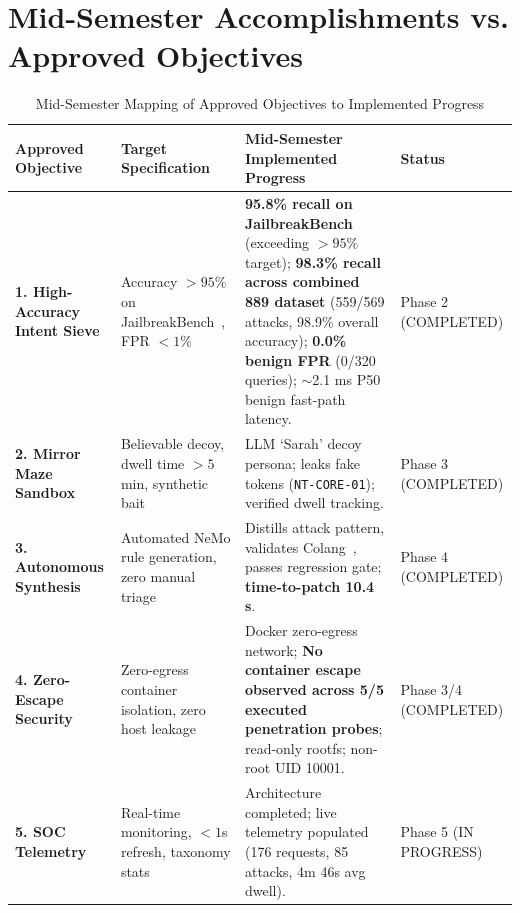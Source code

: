 \documentclass[12pt,a4paper,oneside]{report}
\begin{document}
\section{Mid-Semester Accomplishments vs. Approved Objectives}
\begin{table}[H]
\small
\renewcommand{\arraystretch}{1.2}
\begin{tabularx}{\textwidth}{@{}p{1.3in} p{1.3in} X p{0.8in}@{}}
\rowcolor{HeaderGray} \textbf{Approved Objective} & \textbf{Target Specification} & \textbf{Mid-Semester Implemented Progress} & \textbf{Status} \\
\hline
\textbf{1. High-Accuracy Intent Sieve} & Accuracy $>95\%$ on JailbreakBench~\cite{jailbreakbench2024}, FPR $<1\%$ & \textbf{95.8\% recall on JailbreakBench} (exceeding $>95\%$ target); \textbf{98.3\% recall across combined 889 dataset} (559/569 attacks, 98.9\% overall accuracy); \textbf{0.0\% benign FPR} (0/320 queries); $\sim$2.1 ms P50 benign fast-path latency. & Phase 2 \newline(COMPLETED) \\
\textbf{2. Mirror Maze Sandbox} & Believable decoy, dwell time $>5$ min, synthetic bait & LLM `Sarah' decoy persona; leaks fake tokens (\texttt{NT-CORE-01}); verified dwell tracking. & Phase 3 \newline(COMPLETED) \\
\textbf{3. Autonomous Synthesis} & Automated NeMo rule generation, zero manual triage & Distills attack pattern, validates Colang~\cite{nemo2024guardrails}, passes regression gate; \textbf{time-to-patch 10.4 s}. & Phase 4 \newline(COMPLETED) \\
\textbf{4. Zero-Escape Security} & Zero-egress container isolation, zero host leakage & Docker zero-egress network; \textbf{No container escape observed across 5/5 executed penetration probes}; read-only rootfs; non-root UID 10001. & Phase 3/4 \newline(COMPLETED) \\
\textbf{5. SOC Telemetry} & Real-time monitoring, $<1$s refresh, taxonomy stats & Architecture completed; live telemetry populated (176 requests, 85 attacks, 4m 46s avg dwell). & Phase 5 \newline(IN PROGRESS) \\
\hline
\end{tabularx}
\caption{Mid-Semester Mapping of Approved Objectives to Implemented Progress}
\end{table}
\end{document}
